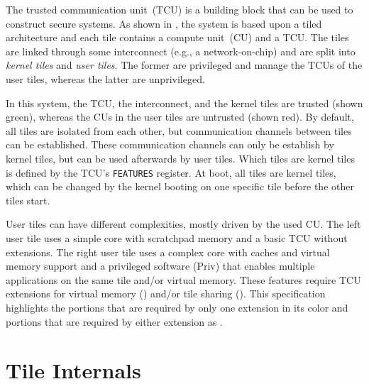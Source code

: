 \noindent The trusted communication unit~(TCU) is a building block that can be used to construct
secure systems. As shown in , the system is based upon a tiled architecture
and each tile contains a compute unit~(CU) and a TCU. The tiles are linked through some interconnect
(e.g., a network-on-chip) and are split into \emph{kernel tiles} and \emph{user tiles}. The former
are privileged and manage the TCUs of the user tiles, whereas the latter are unprivileged.

In this system, the TCU, the interconnect, and the kernel tiles are trusted (shown green), whereas the
CUs in the user tiles are untrusted (shown red). By default, all tiles are isolated from each other, but
communication channels between tiles can be established. These communication channels can only be
establish by kernel tiles, but can be used afterwards by user tiles. Which tiles are kernel tiles is defined
by the TCU's \texttt{FEATURES} register. At boot, all tiles are kernel tiles, which can be changed by
the kernel booting on one specific tile before the other tiles start.

User tiles can have different complexities, mostly driven by the used CU. The left user tile uses a
simple core with scratchpad memory and a basic TCU without extensions. The right user tile uses a
complex core with caches and virtual memory support and a privileged software (Priv) that enables
multiple applications on the same tile and/or virtual memory. These features require TCU extensions
for virtual memory () and/or tile sharing (). This specification highlights
the portions that are required by only one extension in its color and portions that are required by
either extension as .

\section{Tile Internals}

